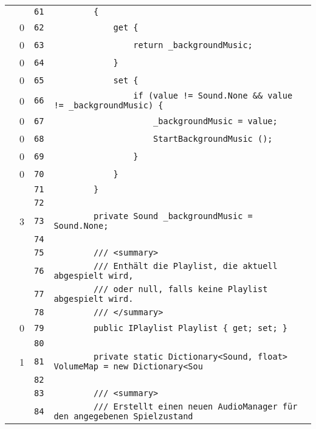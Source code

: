 \documentclass[a4paper,10pt]{article}
\begin{document}
\begin{longtable}[l]{lrrl}
\cellcolor{gray} &  & \verb~61~ & \verb~        {~\\
\cellcolor{red} & 0 & \verb~62~ & \verb~            get {~\\
\cellcolor{red} & 0 & \verb~63~ & \verb~                return _backgroundMusic;~\\
\cellcolor{red} & 0 & \verb~64~ & \verb~            }~\\
\cellcolor{red} & 0 & \verb~65~ & \verb~            set {~\\
\cellcolor{red} & 0 & \verb~66~ & \verb~                if (value != Sound.None && value != _backgroundMusic) {~\\
\cellcolor{red} & 0 & \verb~67~ & \verb~                    _backgroundMusic = value;~\\
\cellcolor{red} & 0 & \verb~68~ & \verb~                    StartBackgroundMusic ();~\\
\cellcolor{red} & 0 & \verb~69~ & \verb~                }~\\
\cellcolor{red} & 0 & \verb~70~ & \verb~            }~\\
\cellcolor{gray} &  & \verb~71~ & \verb~        }~\\
\cellcolor{gray} &  & \verb~72~ & \verb~~\\
\cellcolor{green} & 3 & \verb~73~ & \verb~        private Sound _backgroundMusic = Sound.None;~\\
\cellcolor{gray} &  & \verb~74~ & \verb~~\\
\cellcolor{gray} &  & \verb~75~ & \verb~        /// <summary>~\\
\cellcolor{gray} &  & \verb~76~ & \verb~        /// Enthält die Playlist, die aktuell abgespielt wird,~\\
\cellcolor{gray} &  & \verb~77~ & \verb~        /// oder null, falls keine Playlist abgespielt wird.~\\
\cellcolor{gray} &  & \verb~78~ & \verb~        /// </summary>~\\
\cellcolor{red} & 0 & \verb~79~ & \verb~        public IPlaylist Playlist { get; set; }~\\
\cellcolor{gray} &  & \verb~80~ & \verb~~\\
\cellcolor{green} & 1 & \verb~81~ & \verb~        private static Dictionary<Sound, float> VolumeMap = new Dictionary<Sou~\\
\cellcolor{gray} &  & \verb~82~ & \verb~~\\
\cellcolor{gray} &  & \verb~83~ & \verb~        /// <summary>~\\
\cellcolor{gray} &  & \verb~84~ & \verb~        /// Erstellt einen neuen AudioManager für den angegebenen Spielzustand~\\

\end{longtable}
\end{document}
